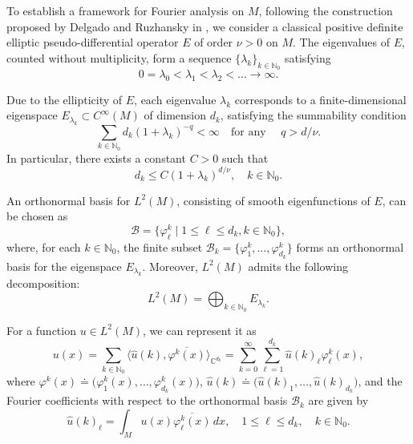 \documentclass{amsart}
\theoremstyle{definition}
\theoremstyle{remark}
\numberwithin{equation}{section}
\begin{document}
	To establish a framework for Fourier analysis on $M$, following the construction proposed by Delgado and Ruzhansky in \cite{DR2018}, we consider a classical positive definite elliptic pseudo-differential operator $E$ of order $\nu > 0$ on $M$. The eigenvalues of $E$, counted without multiplicity, form a sequence $\{ \lambda_k \}_{k \in \mathbb{N}_0}$ satisfying
	$$
	0 = \lambda_0 < \lambda_1 < \lambda_2 < \dots \to \infty.
	$$
	
	Due to the ellipticity of $E$, each eigenvalue $\lambda_k$ corresponds to a finite-dimensional eigenspace $E_{\lambda_k} \subset C^\infty(M)$ of dimension $d_k$, satisfying the summability condition
	\begin{equation*}
		\sum_{k\in\mathbb{N}_0} d_k(1+\lambda_k)^{-q} < \infty \quad \text{for any } \quad q > d/\nu.
	\end{equation*}
	In particular, there exists a constant $C>0$ such that
	\begin{equation}\label{asymp}
		d_k \leq C(1+\lambda_k)^ {d/ \nu}, \quad k\in\mathbb{N}_0.
	\end{equation}
	
	An orthonormal basis for $L^2(M)$, consisting of smooth eigenfunctions of $E$, can be chosen as
	\[
	\mathcal{B} =\{ \varphi_\ell^k \mid 1 \leq \ell \leq d_k,  k \in \mathbb{N}_0 \},
	\]
	where, for each $k \in \mathbb{N}_0$, the finite subset $\mathcal{B}_k=\{\varphi_1^k,\dots,\varphi_{d_k}^k\}$ forms an orthonormal basis for the eigenspace $E_{\lambda_k}$. Moreover, $L^2(M)$ admits the following decomposition:
	$$
	L^2(M) = \bigoplus_{k \in \mathbb{N}_0} E_{\lambda_k}.
	$$
	
	For a function $u \in L^2(M)$, we can represent it as
	\begin{equation}\label{fourier-series-u-in-L2}
		u(x) = \sum_{k\in\mathbb{N}_0} \langle \widehat{u}(k), \overline{\varphi^k(x)} \rangle_{\mathbb{C}^{d_k}}
		= \sum_{k=0}^\infty \sum_{\ell=1}^{d_k} \widehat{u}(k)_\ell \varphi_\ell^k(x),
	\end{equation}
	where $\varphi^k(x) \doteq \big(\varphi^k_1(x), \dots, \varphi^k_{d_k}(x)\big)$, $\widehat{u}(k) \doteq \big(\widehat{u}(k)_1, \dots, \widehat{u}(k)_{d_k}\big)$, and the Fourier coefficients with respect to the orthonormal basis $\mathcal{B}_k$ are given by
	\begin{equation*}
		\widehat{u}(k)_\ell = \int_M u(x)\overline{\varphi^k_\ell(x)} \, dx, \quad 1 \leq \ell \leq d_k, \quad k \in \mathbb{N}_0.
	\end{equation*}
	
\end{document}
